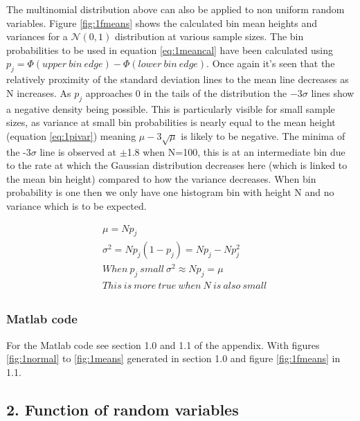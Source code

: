 \documentclass[twoside,twocolumn]{article}
\begin{document}
The multinomial distribution above can also be applied to non uniform random variables. Figure \ref{fig:1fmeans} shows the calculated bin mean heights and variances for a $\mathcal{N}(0,1)$ distribution at various sample sizes. The bin probabilities to be used in equation \ref{eq:1meancal} have been calculated using $p_j=\Phi(upper \:bin \: edge)-\Phi(lower \: bin \: edge)$. Once again it's seen that the relatively proximity of the standard deviation lines to the mean line decreases as N increases. As $p_j$ approaches 0 in the tails of the distribution the $-3\sigma$ lines show a negative density being possible. This is particularly visible for small sample sizes, as variance at small bin probabilities is nearly equal to the mean height (equation \ref{eq:1pivar}) meaning $\mu - 3\sqrt{\mu}$ is likely to be negative. The minima of the -3$\sigma$ line is observed at $\pm$1.8 when N=100, this is at an intermediate bin due to the rate at which the Gaussian distribution decreases here (which is linked to the mean bin height) compared to how the variance decreases. When bin probability is one then we only have one histogram bin with height N and no variance which is to be expected.

\begin{equation}
\label{eq:1pivar}
\begin{split}
&\mu = Np_{j}\\
&\sigma^2=Np_j(1-p_j) = Np_j-Np_j^2\\
&When \: p_j \: small \: \sigma^2\approx Np_j=\mu\\
&This \: is \: more \: true \: when \: N \: is \: also \: small\\ 
\end{split}
\end{equation} 

\subsubsection{Matlab code}%
For the Matlab code see section 1.0 and 1.1 of the appendix. With figures \ref{fig:1normal} to \ref{fig:1means} generated in section 1.0 and figure \ref{fig:1fmeans} in 1.1.
\subsection{2. Function of random variables}
\end{document}
